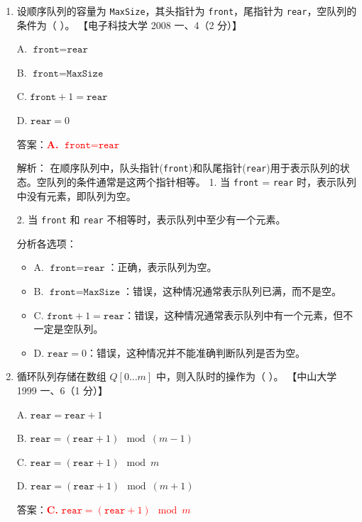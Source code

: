 \documentclass[lang=cn,newtx,10pt,scheme=chinese]{../../../elegantbook}
\begin{document}
\begin{enumerate}
    \item 设顺序队列的容量为 \texttt{MaxSize}，其头指针为 \texttt{front}，尾指针为 \texttt{rear}，空队列的条件为（ ）。  
    【电子科技大学 2008 一、4（2 分）】  

    A. $\texttt{front} = \texttt{rear}$  

    B. $\texttt{front} = \texttt{MaxSize}$  

    C. $\texttt{front} + 1 = \texttt{rear}$  

    D. $\texttt{rear} = 0$  

    答案：\textcolor{red}{\textbf{A.} $\texttt{front} = \texttt{rear}$}

    解析：
    在顺序队列中，队头指针(\texttt{front})和队尾指针(\texttt{rear})用于表示队列的状态。空队列的条件通常是这两个指针相等。
    1. 当 \texttt{front} = \texttt{rear} 时，表示队列中没有元素，即队列为空。

    2. 当 \texttt{front} 和 \texttt{rear} 不相等时，表示队列中至少有一个元素。

    分析各选项：
    \begin{itemize}
        \item A. $\texttt{front} = \texttt{rear}$：正确，表示队列为空。
        
        \item B. $\texttt{front} = \texttt{MaxSize}$：错误，这种情况通常表示队列已满，而不是空。
        
        \item C. $\texttt{front} + 1 = \texttt{rear}$：错误，这种情况通常表示队列中有一个元素，但不一定是空队列。
        
        \item D. $\texttt{rear} = 0$：错误，这种情况并不能准确判断队列是否为空。
        \end{itemize}


    \item 循环队列存储在数组 $Q[0 \ldots m]$ 中，则入队时的操作为（ ）。  
    【中山大学 1999 一、6（1 分）】  

    A. $\texttt{rear} = \texttt{rear} + 1$  

    B. $\texttt{rear} = (\texttt{rear} + 1) \mod (m - 1)$  

    C. $\texttt{rear} = (\texttt{rear} + 1) \mod m$  

    D. $\texttt{rear} = (\texttt{rear} + 1) \mod (m + 1)$  

    答案：\textcolor{red}{\textbf{C.} $\texttt{rear} = (\texttt{rear} + 1) \mod m$}


\end{enumerate}
\end{document}
